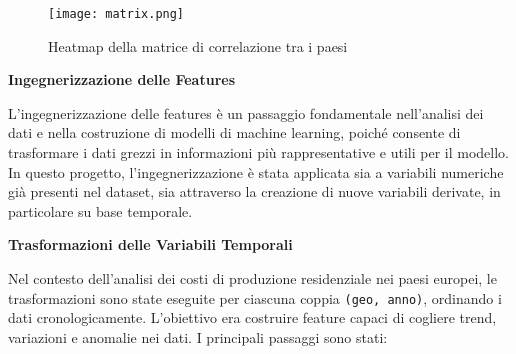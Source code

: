 \documentclass[conference]{IEEEtran}
\begin{document}
\begin{figure}[H]
\centering
\texttt{[image: matrix.png]} %
\caption{Heatmap della matrice di correlazione tra i paesi}
\label{fig:correlation-heatmap}
\end{figure}


\vspace{1em} \noindent\textbf{Ingegnerizzazione delle Features}

L’ingegnerizzazione delle features è un passaggio fondamentale nell’analisi dei dati e nella costruzione di modelli di machine learning, poiché consente di trasformare i dati grezzi in informazioni più rappresentative e utili per il modello. In questo progetto, l’ingegnerizzazione è stata applicata sia a variabili numeriche già presenti nel dataset, sia attraverso la creazione di nuove variabili derivate, in particolare su base temporale.

\noindent\textbf{Trasformazioni delle Variabili Temporali}

Nel contesto dell’analisi dei costi di produzione residenziale nei paesi europei, le trasformazioni sono state eseguite per ciascuna coppia \texttt{(geo, anno)}, ordinando i dati cronologicamente. L’obiettivo era costruire feature capaci di cogliere trend, variazioni e anomalie nei dati. I principali passaggi sono stati:
\end{document}
